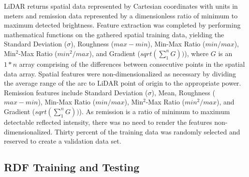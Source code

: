 \documentclass[journal,onecolumn]{IEEEtran}
\begin{document}
			{LiDAR returns spatial data represented by Cartesian coordinates with units in meters and remission data represented by a dimensionless ratio of minimum to maximum detected brightness. Feature extraction was completed by performing mathematical functions on the gathered spatial training data, yielding the Standard Deviation ($\sigma$), Roughness ($max - min$), Min-Max Ratio ($min / max$), Min$^{2}$-Max Ratio ($min^2 / max$), and Gradient ($sqrt(\sum_{1}^{n} G))$), where $G$ is an $1*n$ array comprising of the differences between consecutive points in the spatial data array. Spatial features were non-dimensionalized as necessary by dividing the average range of the arc to LiDAR point of origin to the appropriate power. Remission features include Standard Deviation ($\sigma$), Mean, Roughness ($max - min$), Min-Max Ratio ($min / max$), Min$^{2}$-Max Ratio ($min^2 / max$), and Gradient ($sqrt(\sum_{1}^{n} G))$). As remission is a ratio of minimum to maximum detectable reflected intensity, there was no need to render the features non-dimensionalized. Thirty percent of the training data was randomly selected and reserved to create a validation data set.} 
	
	
		\subsection{RDF Training and Testing}
		
	
\end{document}
